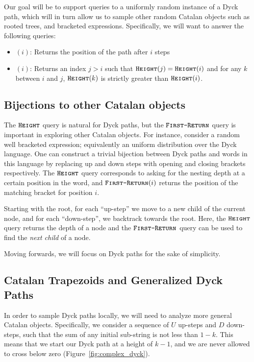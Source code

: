 Our goal will be to support queries to a uniformly random instance of a Dyck path,
which will in turn allow us to sample other random Catalan objects such as rooted trees, and bracketed expressions.
Specifically, we will want to answer the following queries:
\begin{itemize}
    \item {}$(i)$: Returns the position of the path after $i$ steps
    \item {}$(i)$: Returns an index $j>i$ such that $\texttt{\textsc{Height}}(j)=\texttt{\textsc{Height}}(i)$ and for any $k$ between $i$ and $j$,
    $\texttt{\textsc{Height}}(k)$ is strictly greater than $\texttt{\textsc{Height}}(i)$.
\end{itemize}



\subsection{Bijections to other Catalan objects}%
\label{sec:bijections_to_other_catalan_objects}
The $\texttt{\textsc{Height}}$ query is natural for Dyck paths, but the $\texttt{\textsc{First-Return}}$ query is important in exploring other Catalan objects.
For instance, consider a random well bracketed expression; equivalently an uniform distribution over the Dyck language.
One can construct a trivial bijection between Dyck paths and words in this language
by replacing up and down steps with opening and closing brackets respectively.
The $\texttt{\textsc{Height}}$ query corresponds to asking for the nesting depth at a certain position in the word,
and $\texttt{\textsc{First-Return}}(i)$ returns the position of the matching bracket for position $i$.

Starting with the root, for each ``up-step'' we move to a new child of the current node, and for each ``down-step'', we backtrack towards the root.
Here, the $\texttt{\textsc{Height}}$ query returns the depth of a node and the $\texttt{\textsc{First-Return}}$ query can be used to find the \emph{next child} of a node.

Moving forwards, we will focus on Dyck paths for the sake of simplicity.



\subsection{Catalan Trapezoids and Generalized Dyck Paths}
In order to sample Dyck paths locally, we will need to analyze more general Catalan objects.
Specifically, we consider a sequence of $U$ up-steps and $D$ down-steps, such that the sum of any initial sub-string is not less than $1-k$.
This means that we start our Dyck path at a height of $k-1$, and we are never allowed to cross below zero (Figure~\ref{fig:complex_dyck}).


